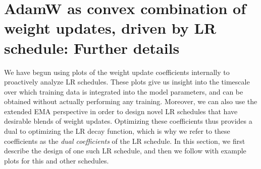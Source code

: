 \section{AdamW as convex combination of weight updates, driven by LR schedule: Further details}

We have begun using plots of the weight update coefficients internally
to proactively analyze LR schedules.  These plots give us insight into
the timescale over which training data is integrated into the model
parameters, and can be obtained without actually performing any
training.
%
Moreover, we can also use the extended EMA perspective in order to
design novel LR schedules that have desirable blends of weight
updates.  Optimizing these coefficients thus provides a dual to
optimizing the LR decay function, which is why we refer to these
coefficients as the \emph{dual coefficients} of the LR schedule.
%
In this section, we first describe the design of one such LR schedule,
and then we follow with example plots for this and other schedules.
%


